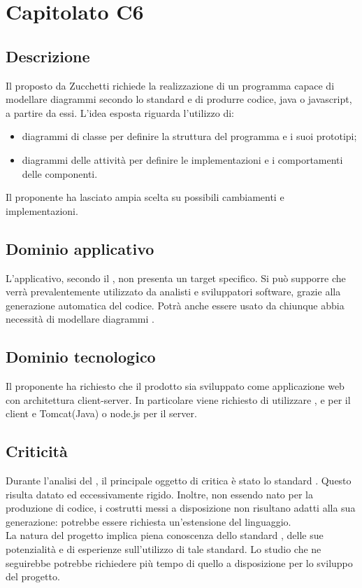 
\section {Capitolato C6}


\subsection {Descrizione}
Il  proposto da Zucchetti richiede la realizzazione di un programma capace di modellare diagrammi secondo lo standard  e di produrre codice, java o javascript, a partire da essi. L'idea esposta riguarda l'utilizzo di:
\begin{itemize}
	\item diagrammi di classe per definire la struttura del programma e i suoi prototipi;
	\item diagrammi delle attività per definire le implementazioni e i comportamenti delle componenti.
\end{itemize}
Il proponente ha lasciato ampia scelta su possibili cambiamenti e implementazioni.


\subsection {Dominio applicativo}
L'applicativo, secondo il , non presenta un target specifico. Si può supporre che verrà prevalentemente utilizzato da analisti e sviluppatori software, grazie alla generazione automatica del codice. Potrà anche essere usato da chiunque abbia necessità di modellare diagrammi .


\subsection {Dominio tecnologico}
Il proponente ha richiesto che il prodotto sia sviluppato come applicazione web con architettura client-server. In particolare viene richiesto di utilizzare ,  e  per il client e Tomcat(Java) o node.js per il server.


\subsection {Criticità}
Durante l’analisi del , il principale oggetto di critica è stato lo standard . Questo risulta datato ed eccessivamente rigido. Inoltre, non essendo nato per la produzione di codice, i costrutti messi a disposizione non risultano adatti alla sua generazione: potrebbe essere richiesta un’estensione del linguaggio. \\
La natura del progetto implica piena conoscenza dello standard , delle sue potenzialità e di esperienze
sull'utilizzo di tale standard. Lo studio che ne seguirebbe potrebbe richiedere più tempo di quello a disposizione per lo sviluppo del progetto.


